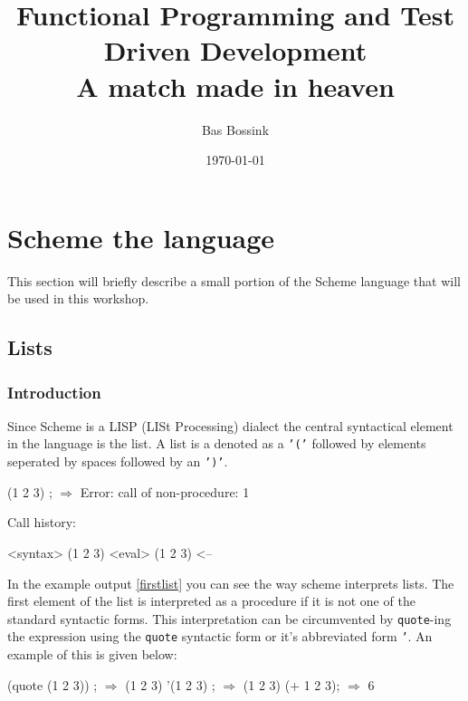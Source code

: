 \documentclass[12pt,a4paper,draft,twoside]{article}
\author{Bas Bossink}
\date{\today}
\title{Functional Programming and Test Driven Development\\
\vspace{2 mm} {\large A match made in heaven}}
\begin{document}
\maketitle

\section{Scheme the language}
This section will briefly describe a small portion of the Scheme language that will be used in this workshop.
\subsection{Lists}
\subsubsection{Introduction}
Since Scheme is a LISP (LISt Processing) dialect the central syntactical element in the language is the list. A list is a denoted as a \texttt{'('} followed by elements seperated by spaces followed by an \texttt{')'}.

\begin{listing}
\label{firstlist}
\begin{schemecode}
(1 2 3) ; $\Rightarrow$ 
	Error: call of non-procedure: 1

	Call history:

	<syntax>	  (1 2 3)
	<eval>	  (1 2 3)	<--

\end{schemecode}
\caption{Example output of the evaluation of a list by a Scheme interperter}
\end{listing}

In the example output \ref{firstlist} you can see the way scheme interprets lists. The first element of the list is interpreted as a procedure if it is not one of the standard syntactic forms. This interpretation can be circumvented by \texttt{quote}-ing the expression using the \texttt{quote} syntactic form or it's abbreviated form \texttt{'}. An example of this is given below:
\begin{listing}
\label{quotedlist}
\begin{schemecode}
(quote (1 2 3)) ; $\Rightarrow$ (1 2 3)
'(1 2 3) ; $\Rightarrow$ (1 2 3)
(+ 1 2 3); $\Rightarrow$ 6
\end{schemecode}
\caption{Example output of the evaluation of a quoted list by a Scheme interperter}
\end{listing}
\end{document}
